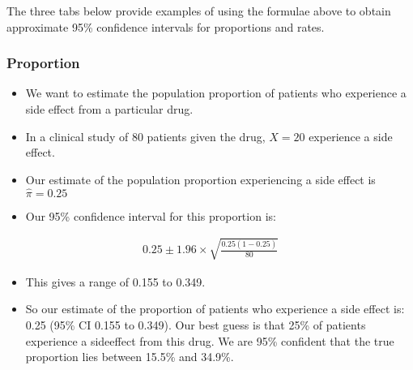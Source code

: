 \documentclass[letterpaper,10pt,english]{jupyterBook}
\begin{document}
\sphinxAtStartPar
The three tabs below provide examples of using the formulae above to obtain approximate 95\% confidence intervals for proportions and rates.
\subsubsection*{Proportion}
\begin{itemize}
\item {} 
\sphinxAtStartPar
We want to estimate the population proportion of patients who experience a side effect from a particular drug.

\item {} 
\sphinxAtStartPar
In a clinical study of \(80\) patients given the drug, \(X=20\) experience a side effect.

\item {} 
\sphinxAtStartPar
Our estimate of the population proportion experiencing a side effect is \(\hat{\pi} = 0.25\)

\item {} 
\sphinxAtStartPar
Our 95\% confidence interval for this proportion is:

\end{itemize}
\begin{equation*}
\begin{split}
0.25 \pm 1.96 \times \sqrt{\frac{0.25 (1-0.25)}{80}}
\end{split}
\end{equation*}\begin{itemize}
\item {} 
\sphinxAtStartPar
This gives a range of 0.155 to 0.349.

\item {} 
\sphinxAtStartPar
So our estimate of the proportion of patients who experience a side effect is: 0.25 (95\% CI 0.155 to 0.349). Our best guess is that 25\% of patients experience a side\sphinxhyphen{}effect from this drug. We are 95\% confident that the true proportion lies between 15.5\% and 34.9\%.

\end{itemize}
\end{document}

